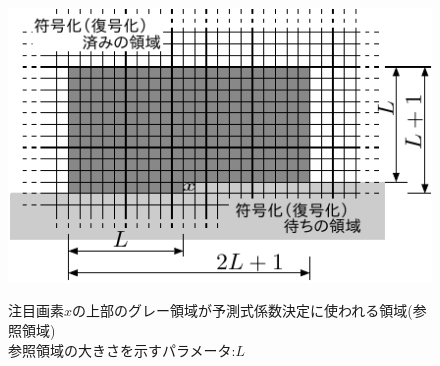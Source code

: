 \documentclass[25pt, landscape,dvipdfmx]{foils}
\begin{document}
\begin{figure}
\begin{center}
\includegraphics[width=20.5cm]{fig/fig2.pdf}
\end{center}
{\small 注目画素$x$の上部のグレー領域が予測式係数決定に使われる領域(参照領域)\\
参照領域の大きさを示すパラメータ:$L$}
\end{figure}
\newpage
\end{document}
